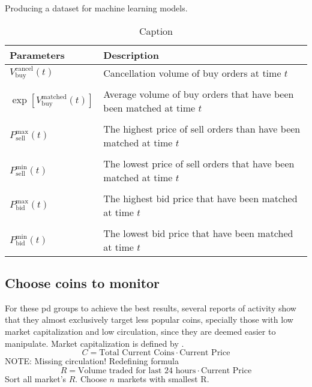Producing a dataset for machine learning models\cite{P&D_stock_price_manipulation}.
\begin{table}
    \centering
    \begin{tabular}{p{} p{}}
        \hline
        \textbf{Parameters} & \textbf{Description}\\
        \hline
         $V_{\text{buy}}^{\text{cancel}} (t) $ & Cancellation volume of buy orders at time $t$\\\\
         $\exp{[V_{\text{buy}}^{\text{matched}}(t)]}$ & Average volume of buy orders that have been been matched at time $t$\\\\
         $P_{\text{sell}}^{\text{max}}(t)$ & The highest price of sell orders than have been matched at time $t$\\\\
         $P_{\text{sell}}^{\text{min}}(t)$ & The lowest price of sell orders that have been matched at time $t$\\\\
         $P_{\text{bid}}^{\text{max}}(t)$  & The highest bid price that have been matched at time $t$\\\\
         $P_{\text{bid}}^{\text{min}}(t)$  & The lowest bid price that have been matched at time $t$\\
         \hline
    \end{tabular}
    \caption{Caption}
    \label{tab:my_label}
\end{table}

\subsection{Choose coins to monitor}
For these \ac{pd} groups to achieve the best results, several reports of activity show that they almost exclusively target less popular coins, specially those with low market capitalization and low circulation, since they are deemed easier to manipulate\cite{P&D_avoid_getting_duped, P&D_here_is_how, P&D_how_to_spot}. Market capitalization is defined by \cite{cryptocurrency_market_cap}. 
\begin{equation}
    C = \text{Total Current Coins} \cdot \text{Current Price}
\end{equation}
NOTE:
Missing circulation! Redefining formula
\begin{equation}
    R = \text{Volume traded for last 24 hours} \cdot \text{Current Price}
\end{equation}
Sort all market's $R$. Choose $n$ markets with smallest R.


